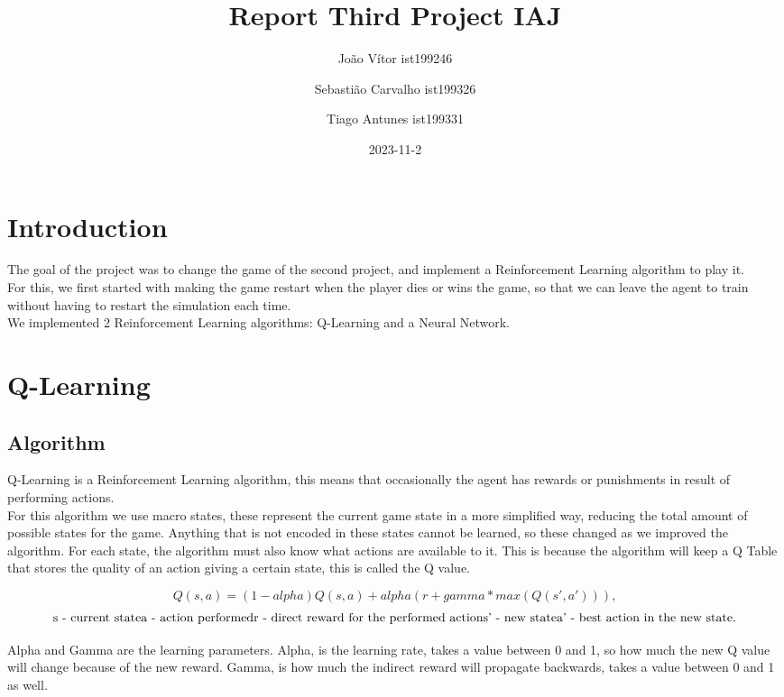 \documentclass{article}
\title{Report Third Project IAJ}
\author{João Vítor ist199246
  \and Sebastião Carvalho ist199326
  \and Tiago Antunes ist199331}
\date{2023-11-2}
\begin{document}
  \maketitle
  \tableofcontents
  \newpage
  \section{Introduction}
  The goal of the project was to change the game of the second project, and implement a Reinforcement Learning algorithm to play it.\\
  For this, we first started with making the game restart when the player dies or wins the game, so that we can leave the agent to train
  without having to restart the simulation each time.\\
  We implemented 2 Reinforcement Learning algorithms: Q-Learning and a Neural Network.\\
  \section{Q-Learning}
  \subsection{Algorithm}
  Q-Learning is a Reinforcement Learning algorithm, this means that occasionally the agent has rewards or punishments in result of
  performing actions.\\
  For this algorithm we use macro states, these represent the current game state in a more simplified way, reducing the total
  amount of possible states for the game. Anything that is not encoded in these states cannot be learned, so these changed as
  we improved the algorithm. For each state, the algorithm must also know what actions are available to it. This is because the
  algorithm will keep a Q Table that stores the quality of an action giving a certain state, this is called the Q value.

  \[Q(s,a) = (1-alpha)Q(s, a) + alpha(r + gamma * max(Q(s', a'))),\]
  \[\text{s - current state \\a - action performed\\ r - direct reward for the performed action\\ s' - new state\\ a' - best action in the new state.}\]

  Alpha and Gamma are the learning parameters.
  Alpha, is the learning rate, takes a value between 0 and 1, so how much the new Q value will change because of the new reward.
  Gamma, is how much the indirect reward will propagate backwards, takes a value between 0 and 1 as well.\\
  
\end{document}
